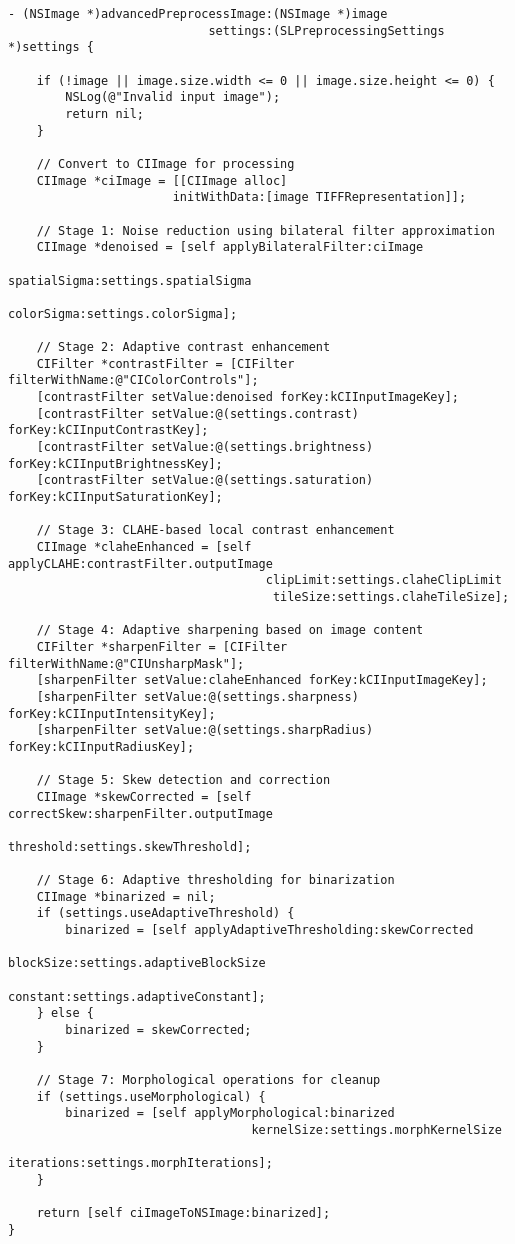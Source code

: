 \begin{verbatim}
- (NSImage *)advancedPreprocessImage:(NSImage *)image 
                            settings:(SLPreprocessingSettings *)settings {
    
    if (!image || image.size.width <= 0 || image.size.height <= 0) {
        NSLog(@"Invalid input image");
        return nil;
    }
    
    // Convert to CIImage for processing
    CIImage *ciImage = [[CIImage alloc] 
                       initWithData:[image TIFFRepresentation]];
    
    // Stage 1: Noise reduction using bilateral filter approximation
    CIImage *denoised = [self applyBilateralFilter:ciImage 
                                       spatialSigma:settings.spatialSigma
                                          colorSigma:settings.colorSigma];
    
    // Stage 2: Adaptive contrast enhancement
    CIFilter *contrastFilter = [CIFilter filterWithName:@"CIColorControls"];
    [contrastFilter setValue:denoised forKey:kCIInputImageKey];
    [contrastFilter setValue:@(settings.contrast) forKey:kCIInputContrastKey];
    [contrastFilter setValue:@(settings.brightness) forKey:kCIInputBrightnessKey];
    [contrastFilter setValue:@(settings.saturation) forKey:kCIInputSaturationKey];
    
    // Stage 3: CLAHE-based local contrast enhancement
    CIImage *claheEnhanced = [self applyCLAHE:contrastFilter.outputImage 
                                    clipLimit:settings.claheClipLimit
                                     tileSize:settings.claheTileSize];
    
    // Stage 4: Adaptive sharpening based on image content
    CIFilter *sharpenFilter = [CIFilter filterWithName:@"CIUnsharpMask"];
    [sharpenFilter setValue:claheEnhanced forKey:kCIInputImageKey];
    [sharpenFilter setValue:@(settings.sharpness) forKey:kCIInputIntensityKey];
    [sharpenFilter setValue:@(settings.sharpRadius) forKey:kCIInputRadiusKey];
    
    // Stage 5: Skew detection and correction
    CIImage *skewCorrected = [self correctSkew:sharpenFilter.outputImage 
                                     threshold:settings.skewThreshold];
    
    // Stage 6: Adaptive thresholding for binarization
    CIImage *binarized = nil;
    if (settings.useAdaptiveThreshold) {
        binarized = [self applyAdaptiveThresholding:skewCorrected
                                         blockSize:settings.adaptiveBlockSize
                                         constant:settings.adaptiveConstant];
    } else {
        binarized = skewCorrected;
    }
    
    // Stage 7: Morphological operations for cleanup
    if (settings.useMorphological) {
        binarized = [self applyMorphological:binarized 
                                  kernelSize:settings.morphKernelSize
                                  iterations:settings.morphIterations];
    }
    
    return [self ciImageToNSImage:binarized];
}
\end{verbatim}

